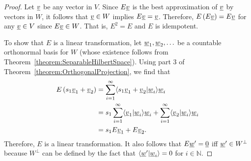 \begin{proof}
Let $\underline{v}$ be any vector in $V$.
Since $E \vecnot{v}$ is the best approximation of $\underline{v}$ by vectors in $W$, it follows that $\underline{v} \in W$ implies $E \underline{v} = \underline{v}$.
Therefore, $E \left( E \underline{v} \right) = E \underline{v}$ for any $\vecnot{v} \in V$ since $E \underline{v} \in W$.
That is, $E^2 = E$ and $E$ is idempotent.

To show that $E$ is a linear transformation, let $\underline{w}_1 , \underline{w}_2 , \ldots$ be a countable orthonormal basis for $W$ (whose existence follows from Theorem~\ref{theorem:SeparableHilbertSpace}).
Using part 3 of Theorem~\ref{theorem:OrthogonalProjection}, we find that
\begin{align*}
E \left( s_1 \underline{v}_1 + \underline{v}_2 \right)
& = \sum_{i=1}^\infty \langle  s_1 \underline{v}_1 + \underline{v}_2 | \underline{w}_i \rangle \underline{w}_i \\
& = s_1 \sum_{i=1}^\infty \langle  \underline{v}_1 | \underline{w}_i \rangle \underline{w}_i + \sum_{i=1}^\infty \langle  \underline{v}_2 | \underline{w}_i \rangle \underline{w}_i \\
& = s_1 E \underline{v}_1 + E \underline{v}_2.
\end{align*}
Therefore, $E$ is a linear transformation.
It also follows that $E \underline{w}' = \underline{0}$ iff $\underline{w}' \in W^{\bot}$ because $W^{\bot}$ can be defined by the fact that $\langle \underline{w}' | \underline{w}_i \rangle = 0$ for $i\in \mathbb{N}$.

\iffalse
To show that $E$ is a linear transformation, consider vectors $\vecnot{v}_1, \vecnot{v}_2 \in V$ and scalar $s \in F$.
Then $\vecnot{v}_1 - E \vecnot{v}_1$ and $\vecnot{v}_2 - E \vecnot{v}_2$ are each orthogonal to every vector in $W$.
The vector
\begin{equation*}
s \left( \vecnot{v}_1 - E \vecnot{v}_1 \right) + \left( \vecnot{v}_2 - E \vecnot{v}_2 \right) = \left( s \vecnot{v}_1 + \vecnot{v}_2 \right) - \left( s E \vecnot{v}_1 + E \vecnot{v}_2 \right)
\end{equation*}
is therefore also orthogonal to every vector in $W$.
Since $s E \vecnot{v}_1 + E \vecnot{v}_2$ is a vector in $W$, it follows from Theorem~\ref{theorem:OrthogonalProjection} that
\begin{equation*}
E \left( s \vecnot{v}_1 + \vecnot{v}_2 \right) = s E \vecnot{v}_1 + E \vecnot{v}_2.
\end{equation*}
That is, $E$ is a linear transformation.

Again, let $\vecnot{v} \in V$.
Then $E \vecnot{v}$ is the unique vector in $W$ such that $\vecnot{v} - E \vecnot{v}$ is in $W^{\bot}$.
In particular, $E \vecnot{v} = \vecnot{0}$ when $\vecnot{v} \in W^{\bot}$.
Conversely, if $E \vecnot{v} = \vecnot{0}$ then $\vecnot{v} \in W^{\bot}$.
Thus $W^{\bot}$ is the nullspace of $E$.
The equation
\begin{equation*}
\vecnot{v} = E \vecnot{v} + \vecnot{v} - E \vecnot{v}
\end{equation*}
shows that $V = W + W^{\bot}$.
Furthermore, $W \cap W^{\bot} = \left\{ \vecnot{0} \right\}$.
Hence $V$ is the direct sum of $W$ and $W^{\bot}$.
\fi


\end{proof}

